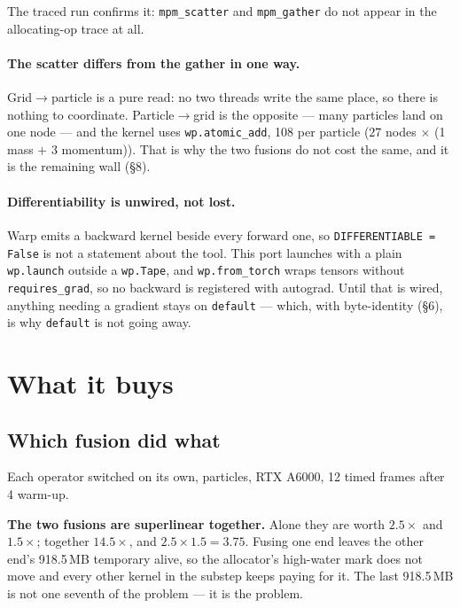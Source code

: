 \documentclass[11pt,a4paper]{article}
\newcommand{\code}[1]{\texttt{\small #1}}
\begin{document}
\noindent
The traced run confirms it: \code{mpm\_scatter} and \code{mpm\_gather} do not appear in the
allocating-op trace at all.

\paragraph{The scatter differs from the gather in one way.} Grid$\rightarrow$particle is a pure read:
no two threads write the same place, so there is nothing to coordinate. Particle$\rightarrow$grid is
the opposite --- many particles land on one node --- and the kernel uses \code{wp.atomic\_add}, 108
per particle ($27$ nodes $\times$ (1 mass $+$ 3 momentum)). That is why the two fusions do not cost
the same, and it is the remaining wall (\S8).

\paragraph{Differentiability is unwired, not lost.} Warp emits a backward kernel beside every forward
one, so \code{DIFFERENTIABLE = False} is not a statement about the tool. This port launches with a
plain \code{wp.launch} outside a \code{wp.Tape}, and \code{wp.from\_torch} wraps tensors without
\code{requires\_grad}, so no backward is registered with autograd. Until that is wired, anything
needing a gradient stays on \code{default} --- which, with byte-identity (\S6), is why
\code{default} is not going away.

\section{What it buys}

\subsection{Which fusion did what}

Each operator switched on its own, \Ntrace{} particles, RTX A6000, 12 timed frames after 4 warm-up.

\begin{center}\footnotesize\tblAblation\end{center}

\noindent
\textbf{The two fusions are superlinear together.} Alone they are worth $2.5\times$ and $1.5\times$;
together $14.5\times$, and $2.5\times1.5=3.75$. Fusing one end leaves the other end's 918.5\,MB
temporary alive, so the allocator's high-water mark does not move and every other kernel in the
substep keeps paying for it. The last 918.5\,MB is not one seventh of the problem --- it is the
problem.
\end{document}
